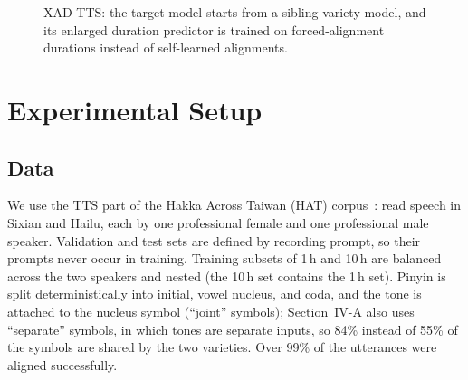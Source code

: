 \documentclass[conference,a4paper]{IEEEtran}
\begin{document}
\begin{figure}[t]
\centering
{}
\caption{XAD-TTS: the target model starts from a sibling-variety model, and its enlarged duration predictor is trained on forced-alignment durations instead of self-learned alignments.}
\label{fig:overview}
\end{figure}

\section{Experimental Setup}

\subsection{Data}
We use the TTS part of the Hakka Across Taiwan (HAT) corpus~\cite{hat2024}: read speech in Sixian and Hailu, each by one professional female and one professional male speaker. Validation and test sets are defined by recording prompt, so their prompts never occur in training. Training subsets of 1\,h and 10\,h are balanced across the two speakers and nested (the 10\,h set contains the 1\,h set). Pinyin is split deterministically into initial, vowel nucleus, and coda, and the tone is attached to the nucleus symbol (``joint'' symbols); Section~IV-A also uses ``separate'' symbols, in which tones are separate inputs, so 84\% instead of 55\% of the symbols are shared by the two varieties. Over 99\% of the utterances were aligned successfully.
\end{document}

